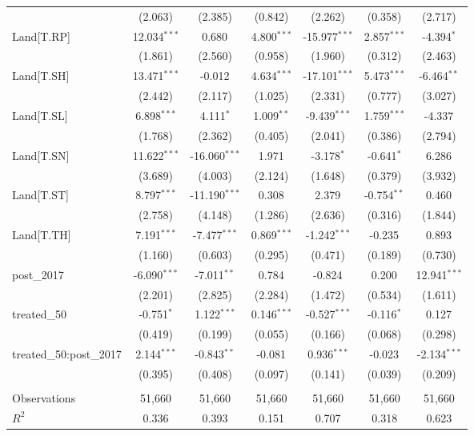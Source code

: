 \begin{table}[!htbp]
\begin{tabular}{@{\extracolsep{5pt}}lcccccc}
  & (2.063) & (2.385) & (0.842) & (2.262) & (0.358) & (2.717) \\
 Land[T.RP] & 12.034$^{***}$ & 0.680$^{}$ & 4.800$^{***}$ & -15.977$^{***}$ & 2.857$^{***}$ & -4.394$^{*}$ \\
  & (1.861) & (2.560) & (0.958) & (1.960) & (0.312) & (2.463) \\
 Land[T.SH] & 13.471$^{***}$ & -0.012$^{}$ & 4.634$^{***}$ & -17.101$^{***}$ & 5.473$^{***}$ & -6.464$^{**}$ \\
  & (2.442) & (2.117) & (1.025) & (2.331) & (0.777) & (3.027) \\
 Land[T.SL] & 6.898$^{***}$ & 4.111$^{*}$ & 1.009$^{**}$ & -9.439$^{***}$ & 1.759$^{***}$ & -4.337$^{}$ \\
  & (1.768) & (2.362) & (0.405) & (2.041) & (0.386) & (2.794) \\
 Land[T.SN] & 11.622$^{***}$ & -16.060$^{***}$ & 1.971$^{}$ & -3.178$^{*}$ & -0.641$^{*}$ & 6.286$^{}$ \\
  & (3.689) & (4.003) & (2.124) & (1.648) & (0.379) & (3.932) \\
 Land[T.ST] & 8.797$^{***}$ & -11.190$^{***}$ & 0.308$^{}$ & 2.379$^{}$ & -0.754$^{**}$ & 0.460$^{}$ \\
  & (2.758) & (4.148) & (1.286) & (2.636) & (0.316) & (1.844) \\
 Land[T.TH] & 7.191$^{***}$ & -7.477$^{***}$ & 0.869$^{***}$ & -1.242$^{***}$ & -0.235$^{}$ & 0.893$^{}$ \\
  & (1.160) & (0.603) & (0.295) & (0.471) & (0.189) & (0.730) \\
 post_2017 & -6.090$^{***}$ & -7.011$^{**}$ & 0.784$^{}$ & -0.824$^{}$ & 0.200$^{}$ & 12.941$^{***}$ \\
  & (2.201) & (2.825) & (2.284) & (1.472) & (0.534) & (1.611) \\
 treated_50 & -0.751$^{*}$ & 1.122$^{***}$ & 0.146$^{***}$ & -0.527$^{***}$ & -0.116$^{*}$ & 0.127$^{}$ \\
  & (0.419) & (0.199) & (0.055) & (0.166) & (0.068) & (0.298) \\
 treated_50:post_2017 & 2.144$^{***}$ & -0.843$^{**}$ & -0.081$^{}$ & 0.936$^{***}$ & -0.023$^{}$ & -2.134$^{***}$ \\
  & (0.395) & (0.408) & (0.097) & (0.141) & (0.039) & (0.209) \\
\hline \\[-1.8ex]
 Observations & 51,660 & 51,660 & 51,660 & 51,660 & 51,660 & 51,660 \\
 $R^2$ & 0.336 & 0.393 & 0.151 & 0.707 & 0.318 & 0.623 \\

\end{tabular}
\end{table}
